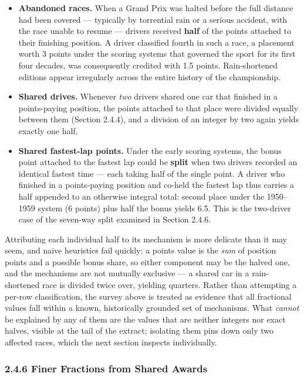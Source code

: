 \documentclass[
]{article}
\providecommand{\tightlist}{%
  \setlength{\itemsep}{0pt}\setlength{\parskip}{0pt}}
\begin{document}
\begin{itemize}
\tightlist
\item
  \textbf{Abandoned races.} When a Grand Prix was halted before the full
  distance had been covered --- typically by torrential rain or a
  serious accident, with the race unable to resume --- drivers received
  \textbf{half} of the points attached to their finishing position. A
  driver classified fourth in such a race, a placement worth 3 points
  under the scoring systems that governed the sport for its first four
  decades, was consequently credited with 1.5 points. Rain-shortened
  editions appear irregularly across the entire history of the
  championship.
\item
  \textbf{Shared drives.} Whenever \emph{two} drivers shared one car
  that finished in a points-paying position, the points attached to that
  place were divided equally between them (Section 2.4.4), and a
  division of an integer by two again yields exactly one half.
\item
  \textbf{Shared fastest-lap points.} Under the early scoring systems,
  the bonus point attached to the fastest lap could be \textbf{split}
  when two drivers recorded an identical fastest time --- each taking
  half of the single point. A driver who finished in a points-paying
  position and co-held the fastest lap thus carries a half appended to
  an otherwise integral total: second place under the 1950--1959 system
  (6 points) plus half the bonus yields 6.5. This is the two-driver case
  of the seven-way split examined in Section 2.4.6.
\end{itemize}

Attributing each individual half to its mechanism is more delicate than
it may seem, and naive heuristics fail quickly: a points value is the
\emph{sum} of position points and a possible bonus share, so either
component may be the halved one, and the mechanisms are not mutually
exclusive --- a shared car in a rain-shortened race is divided twice
over, yielding quarters. Rather than attempting a per-row
classification, the survey above is treated as evidence that all
fractional values fall within a known, historically grounded set of
mechanisms. What \emph{cannot} be explained by any of them are the
values that are neither integers nor exact halves, visible at the tail
of the extract; isolating them pins down only two affected races, which
the next section inspects individually.

\newpage

\subsubsection{2.4.6 Finer Fractions from Shared
Awards}\label{finer-fractions-from-shared-awards}
\end{document}
